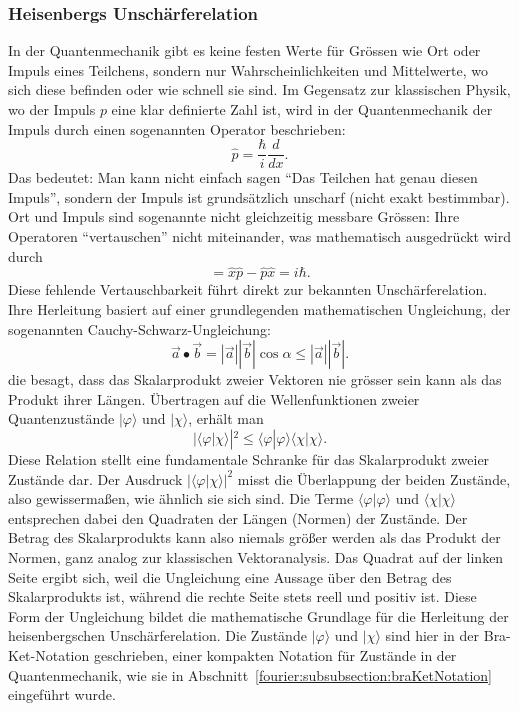 	\subsubsection{Heisenbergs Unschärferelation%
	\label{fourier:subsubsection:unschaerferelation}}
	In der Quantenmechanik gibt es keine festen Werte für Grössen wie Ort oder Impuls eines Teilchens, sondern nur Wahrscheinlichkeiten und Mittelwerte, wo sich diese befinden oder wie schnell sie sind.
	Im Gegensatz zur klassischen Physik, wo der Impuls $p$ eine klar definierte Zahl ist, wird in der Quantenmechanik der Impuls durch einen sogenannten Operator beschrieben:
	\begin{equation}
		\hat{p} = \frac{\hbar}{i} \frac{d}{dx}.
	\end{equation}
	Das bedeutet:
	Man kann nicht einfach sagen ``Das Teilchen hat genau diesen Impuls'', sondern der Impuls ist grundsätzlich unscharf (nicht exakt bestimmbar).
	Ort und Impuls sind sogenannte nicht gleichzeitig messbare Grössen:
	Ihre Operatoren ``vertauschen'' nicht miteinander, was mathematisch ausgedrückt wird durch
	\begin{equation}
		[\hat{x},\hat{p}] = \hat{x} \hat{p} - \hat{p} \hat{x} = i \hbar.
	\end{equation}
	Diese fehlende Vertauschbarkeit führt direkt zur bekannten Unschärferelation.
	Ihre Herleitung basiert auf einer grundlegenden mathematischen Ungleichung, der sogenannten Cauchy-Schwarz-Ungleichung:
	\begin{equation}
		\vec{a} \bullet \vec{b} = |\vec{a}| |\vec{b}|\cos\alpha \le |\vec{a}| |\vec{b}|.
	\end{equation}
	die besagt, dass das Skalarprodukt zweier Vektoren nie grösser sein kann als das Produkt ihrer Längen.
	Übertragen auf die Wellenfunktionen zweier Quantenzustände $|\varphi\rangle$ und $|\chi\rangle$, erhält man
	\begin{equation}
		|\langle\varphi | \chi\rangle|^2 \le \langle\varphi | \varphi\rangle \langle\chi | \chi\rangle.
	\end{equation}
	Diese Relation stellt eine fundamentale Schranke für das Skalarprodukt zweier Zustände dar.
	Der Ausdruck $|\langle\varphi|\chi\rangle|^2$ misst die Überlappung der beiden Zustände, also gewissermaßen, wie ähnlich sie sich sind.
	Die Terme $\langle\varphi|\varphi\rangle$ und $\langle\chi|\chi\rangle$ entsprechen dabei den Quadraten der Längen (Normen) der Zustände.
	Der Betrag des Skalarprodukts kann also niemals größer werden als das Produkt der Normen, ganz analog zur klassischen Vektoranalysis.
	Das Quadrat auf der linken Seite ergibt sich, weil die Ungleichung eine Aussage über den Betrag des Skalarprodukts ist, während die rechte Seite stets reell und positiv ist.
	Diese Form der Ungleichung bildet die mathematische Grundlage für die Herleitung der heisenbergschen Unschärferelation.
	Die Zustände $|\varphi\rangle$ und $|\chi\rangle$ sind hier in der Bra-Ket-Notation geschrieben, einer kompakten Notation für Zustände in der Quantenmechanik, wie sie in Abschnitt~\ref{fourier:subsubsection:braKetNotation} eingeführt wurde.

